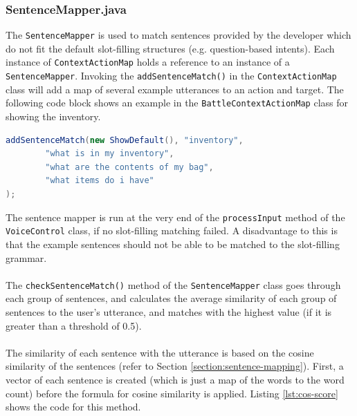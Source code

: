 \documentclass[12pt]{article}
\begin{document}
\subsubsection{SentenceMapper.java}

The \texttt{SentenceMapper} is used to match sentences provided by the developer which do not fit the default slot-filling structures (e.g. question-based intents). Each instance of \texttt{ContextActionMap} holds a reference to an instance of a \texttt{SentenceMapper}. Invoking the \texttt{addSentenceMatch()} in the \texttt{ContextActionMap} class will add a map of several example utterances to an action and target. The following code block shows an example in the \texttt{BattleContextActionMap} class for showing the inventory.

\begin{lstlisting}[language=Java]
addSentenceMatch(new ShowDefault(), "inventory",
        "what is in my inventory",
        "what are the contents of my bag",
        "what items do i have"
);
\end{lstlisting}

The sentence mapper is run at the very end of the \texttt{processInput} method of the \texttt{VoiceControl} class, if no slot-filling matching failed. A disadvantage to this is that the example sentences should not be able to be matched to the slot-filling grammar.
\\
\\
The \texttt{checkSentenceMatch()} method of the \texttt{SentenceMapper} class goes through each group of sentences, and calculates the average similarity of each group of sentences to the user's utterance, and matches with the highest value (if it is greater than a threshold of 0.5).
\\
\\
The similarity of each sentence with the utterance is based on the cosine similarity of the sentences (refer to Section \ref{section:sentence-mapping}). First, a vector of each sentence is created (which is just a map of the words to the word count) before the formula for cosine similarity is applied. Listing \ref{lst:cos-score} shows the code for this method.
\end{document}
